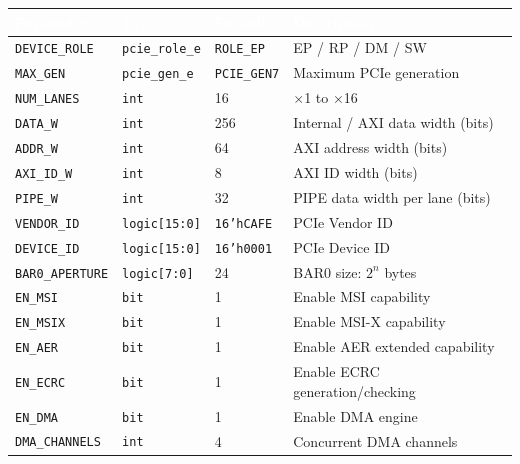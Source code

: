 \documentclass[11pt,a4paper]{article}
\newcommand{\theadcell}[1]{%
  \cellcolor{tablehead}\textcolor{white}{\textbf{#1}}}
\begin{document}
\begin{tabular}{lllp{6cm}}
  \toprule
  \theadcell{Parameter} & \theadcell{Type} & \theadcell{Default} & \theadcell{Description} \\
  \midrule
  \texttt{DEVICE\_ROLE}   & \texttt{pcie\_role\_e} & \texttt{ROLE\_EP}   & EP / RP / DM / SW \\
  \texttt{MAX\_GEN}       & \texttt{pcie\_gen\_e}  & \texttt{PCIE\_GEN7} & Maximum PCIe generation \\
  \texttt{NUM\_LANES}     & \texttt{int}           & 16                  & $\times$1 to $\times$16 \\
  \texttt{DATA\_W}        & \texttt{int}           & 256                 & Internal / AXI data width (bits) \\
  \texttt{ADDR\_W}        & \texttt{int}           & 64                  & AXI address width (bits) \\
  \texttt{AXI\_ID\_W}     & \texttt{int}           & 8                   & AXI ID width (bits) \\
  \texttt{PIPE\_W}        & \texttt{int}           & 32                  & PIPE data width per lane (bits) \\
  \texttt{VENDOR\_ID}     & \texttt{logic[15:0]}   & \texttt{16'hCAFE}   & PCIe Vendor ID \\
  \texttt{DEVICE\_ID}     & \texttt{logic[15:0]}   & \texttt{16'h0001}   & PCIe Device ID \\
  \texttt{BAR0\_APERTURE} & \texttt{logic[7:0]}    & 24                  & BAR0 size: $2^n$ bytes \\
  \texttt{EN\_MSI}        & \texttt{bit}           & 1                   & Enable MSI capability \\
  \texttt{EN\_MSIX}       & \texttt{bit}           & 1                   & Enable MSI-X capability \\
  \texttt{EN\_AER}        & \texttt{bit}           & 1                   & Enable AER extended capability \\
  \texttt{EN\_ECRC}       & \texttt{bit}           & 1                   & Enable ECRC generation/checking \\
  \texttt{EN\_DMA}        & \texttt{bit}           & 1                   & Enable DMA engine \\
  \texttt{DMA\_CHANNELS}  & \texttt{int}           & 4                   & Concurrent DMA channels \\
  \bottomrule
\end{tabular}
\end{document}
